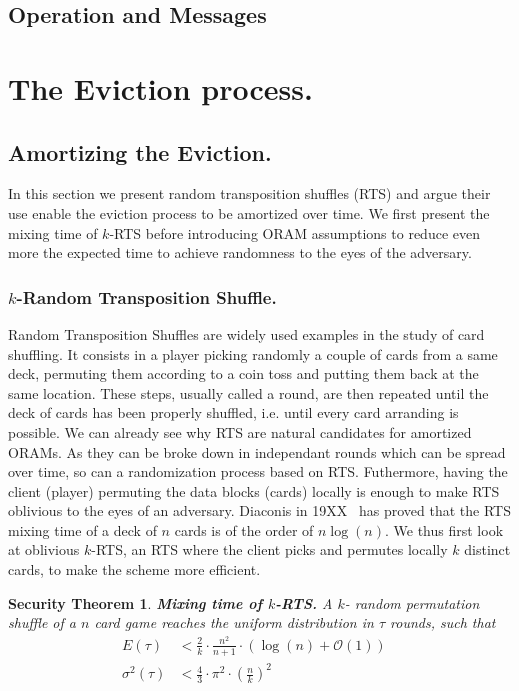 \documentclass[a4paper]{article}
\newtheorem{secthm}{Security Theorem}
\begin{document}
\subsection{Operation and Messages}
\section{The Eviction process.}
\subsection{Amortizing the Eviction.}
In this section we present random transposition shuffles (RTS) and argue their use enable the eviction process to be amortized over time.
We first present the mixing time of $k$-RTS before introducing ORAM assumptions to reduce even more the expected time to achieve randomness to the eyes of the adversary.

\subsubsection{$k$-Random Transposition Shuffle.}
Random Transposition Shuffles are widely used examples in the study of card shuffling. It consists in a player picking randomly a couple of cards from a same deck, permuting them according to a coin toss and putting them back at the same location.
These steps, usually called a round, are then repeated until the deck of cards has been properly shuffled, i.e. until every card arranding is possible.
We can already see why RTS are natural candidates for amortized ORAMs. As they can be broke down in independant rounds which can be spread over time, so can a randomization process based on RTS. Futhermore, having the client (player) permuting the data blocks (cards) locally is enough to make RTS oblivious to the eyes of an adversary.
Diaconis in 19XX~\cite{} has proved that the RTS mixing time of a deck of $n$ cards is of the order of $n\log(n)$. We thus first look at oblivious $k$-RTS, an RTS where the client picks and permutes locally $k$ distinct cards, to make the scheme more efficient.

\begin{secthm}
\textbf{Mixing time of $k$-RTS.} A $k$- random permutation shuffle of a $n$ card game reaches the uniform distribution in $\tau$ rounds, such that
\begin{align*}
E(\tau) &< \frac{2}{k}\cdot\frac{n^2}{n+1}\cdot \left ( \log(n) + \mathcal{O}(1) \right ) &\\
\sigma^2(\tau) &< \frac{4}{3} \cdot {\pi}^2 \cdot \left ( \frac{n}{k} \right )^2 &
\end{align*}
\end{secthm}
\end{document}
